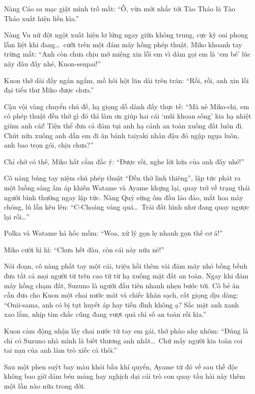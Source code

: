 \documentclass[../main.tex]{subfiles}
\begin{document}
Nàng Cáo sa mạc giật mình trố mắt: ``Ồ, vừa mới nhắc tới Tào Tháo là Tào Tháo xuất hiện liền kìa.''

Nàng Vu nữ đột ngột xuất hiện lơ lửng ngay giữa không trung, cực kỳ oai phong lẫm liệt khi đang\dots\ cưỡi trên một đám mây hồng phép thuật. Miko khoanh tay trừng mắt: ``Anh còn chưa chịu mở miệng xin lỗi em vì dám gọi em là `em bé' lúc nãy đâu đấy nhé, Kuon-senpai!''

Kuon thở dài đầy ngán ngẩm, mồ hôi hột lăn dài trên trán: ``Rồi, rồi, anh xin lỗi đại tiểu thư Miko được chưa.''

Cậu vội vàng chuyển chủ đề, hạ giọng dỗ dành đầy thực tế: ``Mà nè Miko-chi, em có phép thuật đền thờ gì đó thì làm ơn giúp hai cái `mũi khoan sống' kia hạ nhiệt giùm anh cái! Tiện thể đưa cả đám tụi anh hạ cánh an toàn xuống đất luôn đi. Chút nữa xuống anh dẫn em đi ăn bánh taiyaki nhân đậu đỏ ngập ngụa luôn, anh bao trọn gói, chịu chưa?''

Chỉ chờ có thế, Miko hất cằm đắc ý: ``Được rồi, nghe lời hứa của anh đấy nhé!''

Cô nàng búng tay niệm chú phép thuật ``Đền thờ linh thiêng'', lập tức phát ra một luồng sáng ấm áp khiến Watame và Ayame khựng lại, quay trở về trạng thái người bình thường ngay lập tức. Nàng Quỷ sừng ôm đầu lảo đảo, mắt hoa mày chóng, lú lẫn kêu lên: ``C-Choáng váng quá\dots\ Trái đất hình như đang quay ngược lại rồi\dots''

Polka và Watame há hốc mồm: ``Woa, xử lý gọn lẹ nhanh gọn thế cơ á!''

Miko cười hì hì: ``Chưa hết đâu, còn cái này nữa nè!''

Nói đoạn, cô nàng phất tay một cái, triệu hồi thêm vài đám mây nhỏ bồng bềnh đưa tất cả mọi người từ trên cao từ từ hạ xuống mặt đất an toàn. Ngay khi đám mây hồng chạm đất, Suzuno là người đầu tiên nhanh nhẹn bước tới. Cô bé ân cần đưa cho Kuon một chai nước mát và chiếc khăn sạch, cất giọng dịu dàng: ``Onii-sama, anh có bị tụt huyết áp hay tiền đình không ạ? Sắc mặt anh xanh xao lắm, nhịp tim chắc cũng đang vượt quá chỉ số an toàn rồi kìa.''

Kuon cảm động nhận lấy chai nước từ tay em gái, thở phào nhẹ nhõm: ``Đúng là chỉ có Suzuno nhà mình là biết thương anh nhất\dots\ Chứ mấy người kia toàn coi tai nạn của anh làm trò xiếc cả thôi.''

Sau một phen suýt bay màu khỏi bầu khí quyển, Ayame từ đó về sau thề độc không bao giờ dám bén mảng hay nghịch dại cái trò con quay tấu hài này thêm một lần nào nữa trong đời.
\end{document}

